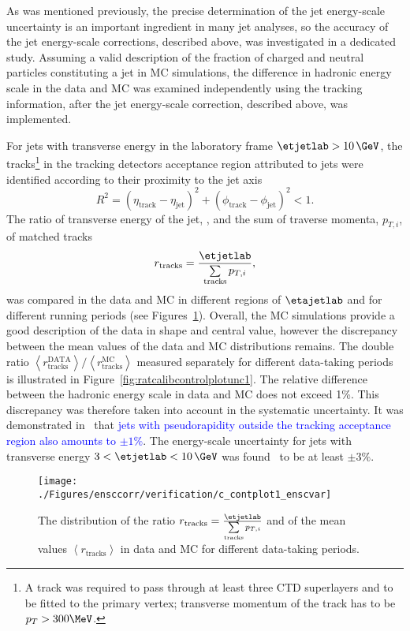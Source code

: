 As  was mentioned previously, the precise determination of the jet energy-scale uncertainty is an important ingredient in many jet analyses, so the accuracy of the jet energy-scale corrections, described above, was investigated in a dedicated study. Assuming a valid description of the fraction of charged and neutral particles constituting a jet in MC simulations, the difference in hadronic energy scale in the data and MC was examined independently using the tracking information, after the jet energy-scale correction, described above, was implemented. 

For jets with transverse energy in the laboratory frame $\etjetlab > 10\,\GeV$, the tracks\footnote{A track was required to pass through at least three CTD superlayers and to be fitted to the primary vertex; transverse momentum of the track has to be $p_T > 300 \MeV$.} in the tracking detectors acceptance region attributed to jets were identified according to their proximity to the jet axis
\begin{equation}
R^2 = \left(\eta_{\mathrm{track}} - \eta_{\mathrm{jet}}\right)^2 + \left(\phi_{\mathrm{track}} - \phi_{\mathrm{jet}}\right)^2 < 1.
\label{eq:rtrackjetcut}
\end{equation}
The ratio of transverse energy of the jet, \etjetlab, and the sum of traverse momenta, $p_{T,i}$, of matched tracks 
\begin{equation}
r_\text{tracks} = \frac{\etjetlab}{\sum\limits_{\text{tracks}}{p_{T,i}}},
\end{equation}
was compared in the data and MC in different regions of $\etajetlab$ and for different running periods (see Figures~\ref{fig:ratcalibcontrolplotunc}). Overall, the MC simulations provide a good description of the data in shape and central value, however the discrepancy between the mean values of the data and MC distributions remains. The double ratio $\left<r_\text{tracks}^\text{DATA}\right>/\left<r_\text{tracks}^\text{MC}\right>$ measured separately for different data-taking periods is illustrated in Figure~\ref{fig:ratcalibcontrolplotunc1}. The relative difference between the hadronic energy scale in data and MC does not exceed 1\%. This discrepancy was therefore taken into account in the systematic uncertainty. It was demonstrated in~\cite{thesis:behr:2010,thesis:perrey:2011} that \textcolor{blue}{jets with pseudorapidity outside the tracking acceptance region also amounts to $\pm 1\%$}. The energy-scale uncertainty for jets with transverse energy $3<\etjetlab<10\,\GeV$ was found~\cite{thesis:behr:2010} to be at least $\pm 3\%$.
\begin{figure}[h!]
	\centering
		\texttt{[image: ./Figures/ensccorr/verification/c\_contplot1\_enscvar]} 
	\caption{The distribution of the ratio $r_\text{tracks} = \frac{\etjetlab}{\sum\limits_{\text{tracks}}{p_{T,i}}}$ and of the mean values $\left\langle r_\text{tracks}\right\rangle$ in data and MC for different data-taking periods.}
	\label{fig:ratcalibcontrolplotunc}
\end{figure}

